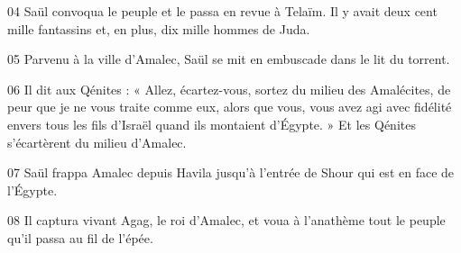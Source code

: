 
04 Saül convoqua le peuple et le passa en revue à Telaïm. Il y avait deux cent mille fantassins et, en plus, dix mille hommes de Juda.

05 Parvenu à la ville d’Amalec, Saül se mit en embuscade dans le lit du torrent.

06 Il dit aux Qénites : « Allez, écartez-vous, sortez du milieu des Amalécites, de peur que je ne vous traite comme eux, alors que vous, vous avez agi avec fidélité envers tous les fils d’Israël quand ils montaient d’Égypte. » Et les Qénites s’écartèrent du milieu d’Amalec.

07 Saül frappa Amalec depuis Havila jusqu’à l’entrée de Shour qui est en face de l’Égypte.


08 Il captura vivant Agag, le roi d’Amalec, et voua à l’anathème tout le peuple qu’il passa au fil de l’épée.
